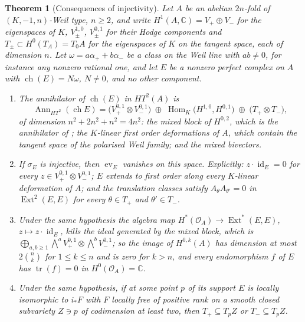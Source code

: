 \documentclass[11pt,reqno]{amsart}
\theoremstyle{plain}
\newtheorem{theorem}{Theorem}[section]
\theoremstyle{definition}
\theoremstyle{remark}
\newcommand{\CC}{\mathbb{C}}
\newcommand{\cO}{\mathcal{O}}
\DeclareMathOperator{\ch}{ch}
\DeclareMathOperator{\Hom}{Hom}
\DeclareMathOperator{\Ext}{Ext}
\DeclareMathOperator{\id}{id}
\DeclareMathOperator{\Ann}{Ann}
\begin{document}
\begin{theorem}[Consequences of injectivity]
\label{thm:p2forces}
Let $A$ be an abelian $2n$-fold of $(K,-1,n)$-Weil type, $n\ge2$, and write
$H^{1}(A,\CC)=V_{+}\oplus V_{-}$ for the eigenspaces of $K$,
$V_{\pm}^{1,0}$, $V_{\pm}^{0,1}$ for their Hodge components and
$T_{\pm}\subset H^{0}(T_{A})=T_{0}A$ for the eigenspaces of $K$ on the tangent
space, each of dimension $n$. Let $\omega=a\alpha_{+}+b\alpha_{-}$ be a
class on the Weil line with $ab\ne0$, for instance any nonzero rational one,
and let $E$ be a nonzero perfect complex on $A$ with $\ch(E)=N\omega$,
$N\ne0$, and no other component.
\begin{enumerate}[label=\textup{(\roman*)},leftmargin=2.6em,itemsep=2pt]
\item The annihilator of $\ch(E)$ in $HT^{2}(A)$ is
  \[
    \Ann_{HT^{2}}(\ch E)
    =\bigl(V_{+}^{0,1}\otimes V_{-}^{0,1}\bigr)
    \;\oplus\;\Hom_{K}\bigl(H^{1,0},H^{0,1}\bigr)
    \;\oplus\;\bigl(T_{+}\otimes T_{-}\bigr),
  \]
  of dimension $n^{2}+2n^{2}+n^{2}=4n^{2}$: the mixed block of $H^{0,2}$,
  which is the annihilator of \cite[Lemma~9.6]{paperI}; the $K$-linear first
  order deformations of $A$, which contain the tangent space of the polarised
  Weil family; and the mixed bivectors.
\item If $\sigma_{E}$ is injective, then $\operatorname{ev}_{E}$ vanishes on
  this space. Explicitly: $z\cdot\id_{E}=0$ for every $z\in V_{+}^{0,1}\otimes
  V_{-}^{0,1}$; $E$ extends to first order along every $K$-linear deformation
  of $A$; and the translation classes satisfy $A_{\theta}A_{\theta'}=0$ in
  $\Ext^{2}(E,E)$ for every $\theta\in T_{+}$ and $\theta'\in T_{-}$.
\item Under the same hypothesis the algebra map $H^{*}(\cO_{A})\to\Ext^{*}(E,E)$,
  $z\mapsto z\cdot\id_{E}$, kills the ideal generated by the mixed block,
  which is $\bigoplus_{a,b\ge1}\bigwedge^{a}V_{+}^{0,1}\otimes\bigwedge^{b}V_{-}^{0,1}$;
  so the image of $H^{0,k}(A)$ has dimension at most $2\binom{n}{k}$ for
  $1\le k\le n$ and is zero for $k>n$, and every endomorphism $f$ of $E$ has
  $\operatorname{tr}(f)=0$ in $H^{0}(\cO_{A})=\CC$.
\item Under the same hypothesis, if at some point $p$ of its support $E$ is
  locally isomorphic to $i_{*}F$ with $F$ locally free of positive rank on a
  smooth closed subvariety $Z\ni p$ of codimension at least two, then
  $T_{+}\subseteq T_{p}Z$ or $T_{-}\subseteq T_{p}Z$.
\end{enumerate}
\end{theorem}
\end{document}
